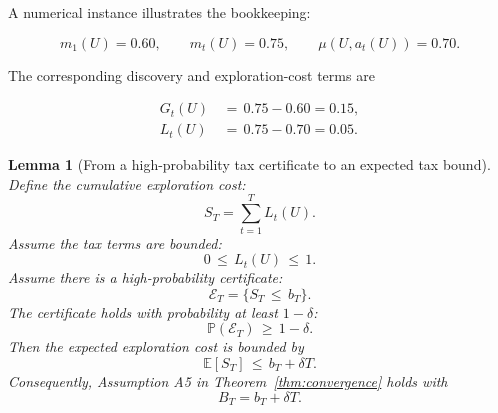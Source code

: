 \documentclass{article} %
\newtheorem{lemma}[theorem]{Lemma}
\begin{document}
A numerical instance illustrates the bookkeeping:

\begin{equation}
\label{eq:app-fifth-numeric-bookkeeping}
m_1(U)=0.60,
\qquad
m_t(U)=0.75,
\qquad
\mu(U,a_t(U))=0.70.
\end{equation}

The corresponding discovery and exploration-cost terms are

\begin{align}
\label{eq:app-fifth-numeric-bookkeeping-terms}
G_t(U)
&\,=\,
0.75-0.60
=
0.15,
\\
L_t(U)
&\,=\,
0.75-0.70
=
0.05.
\end{align}

\begin{lemma}[From a high-probability tax certificate to an expected tax bound]
\label{lem:6}
Define the cumulative exploration cost:
\begin{equation}
\label{eq:app-fifth-ST}
S_T
=
\sum_{t=1}^{T}L_t(U).
\end{equation}
Assume the tax terms are bounded:
\begin{equation}
\label{eq:app-fifth-tax-bounded}
0\,\le\, L_t(U)\,\le\, 1.
\end{equation}
Assume there is a high-probability certificate:
\begin{equation}
\label{eq:app-fifth-event-cert}
\mathcal{E}_T
=
\{S_T\,\le\, b_T\}.
\end{equation}
The certificate holds with probability at least \(1-\delta\):
\begin{equation}
\label{eq:app-fifth-event-prob}
\mathbb{P}(\mathcal{E}_T)\,\ge\, 1-\delta.
\end{equation}
Then the expected exploration cost is bounded by
\begin{equation}
\label{eq:app-fifth-expected-tax}
\mathbb{E}[S_T]
\,\le\,
b_T+\delta T.
\end{equation}
Consequently, Assumption A5 in Theorem~\ref{thm:convergence} holds with
\begin{equation}
\label{eq:app-fifth-BT-from-cert}
B_T
=
b_T+\delta T.
\end{equation}
\end{lemma}
\end{document}
